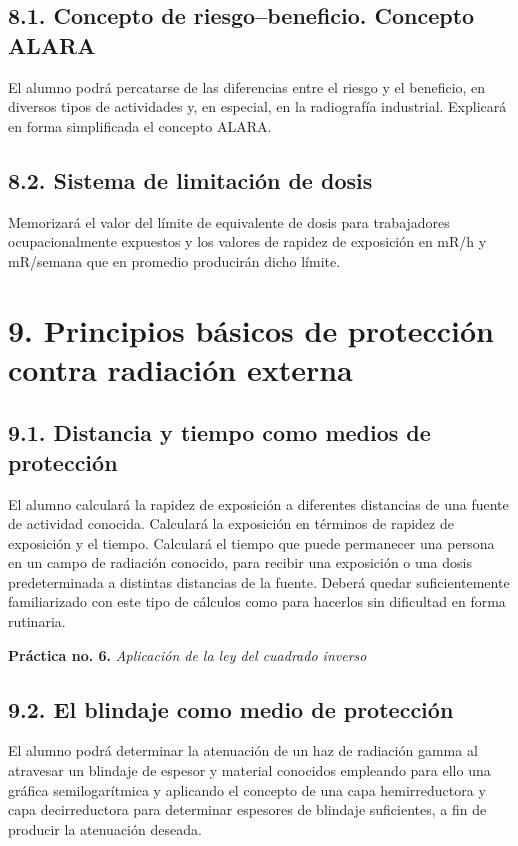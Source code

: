 \subsection*{8.1. Concepto de riesgo--beneficio. Concepto ALARA}
El alumno podrá percatarse de las diferencias entre el riesgo y el beneficio, en diversos tipos de actividades y, en especial, en la radiografía industrial. Explicará en forma simplificada el concepto ALARA.

\subsection*{8.2. Sistema de limitación de dosis}
Memorizará el valor del límite de equivalente de dosis para trabajadores ocupacionalmente expuestos y los valores de rapidez de exposición en mR/h y mR/semana que en promedio producirán dicho límite.

\section*{9. Principios básicos de protección contra radiación externa}

\subsection*{9.1. Distancia y tiempo como medios de protección }
El alumno calculará la rapidez de exposición a diferentes distancias de una fuente de actividad conocida. Calculará la exposición en términos de rapidez de exposición y el tiempo. Calculará el tiempo que puede permanecer una persona en un campo de radiación conocido, para recibir una exposición o una dosis predeterminada a distintas distancias de la fuente. Deberá quedar suficientemente familiarizado con este tipo de cálculos como para hacerlos sin dificultad en forma rutinaria.

\textbf{Práctica no. 6.} \emph{Aplicación de la ley del cuadrado inverso} 

\subsection*{9.2. El blindaje como medio de protección }
El alumno podrá determinar la atenuación de un haz de radiación gamma al atravesar un blindaje de espesor y material conocidos empleando para ello una gráfica semilogarítmica y aplicando el concepto de una capa hemirreductora y capa decirreductora para determinar espesores de blindaje suficientes, a fin de producir la atenuación deseada.


